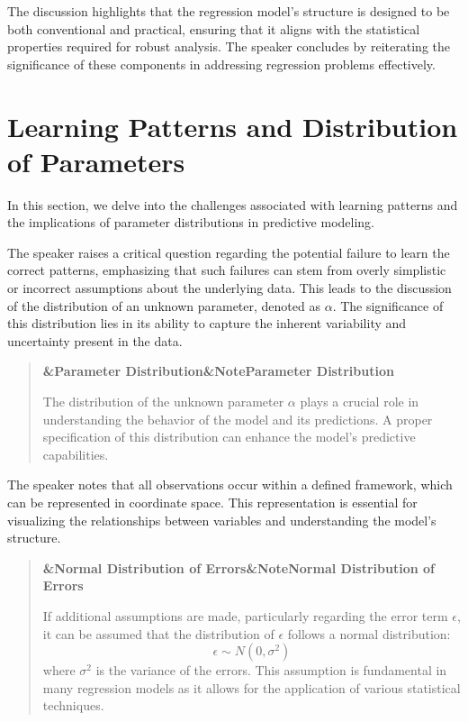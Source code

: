 \documentclass[a4paper]{article}
\providecommand{\mathcal}[1]{\mathit{#1}}
\newcommand{\boxheading}[1]{%
  \par\smallskip
  \noindent\textbf{\ifx&#1&Note\else#1\fi}\par
  \smallskip
}
\newenvironment{thmbox}[1][]{%
  \begin{quote}\color{blue!60!black}\boxheading{#1}\normalcolor
}{\end{quote}}
\newenvironment{rembox}[1][]{%
  \begin{quote}\color{black!70}\boxheading{#1}\normalcolor
}{\end{quote}}
\begin{document}
The discussion highlights that the regression model's structure is designed to be both conventional and practical, ensuring that it aligns with the statistical properties required for robust analysis. The speaker concludes by reiterating the significance of these components in addressing regression problems effectively.

\section{Learning Patterns and Distribution of Parameters}
In this section, we delve into the challenges associated with learning patterns and the implications of parameter distributions in predictive modeling.

The speaker raises a critical question regarding the potential failure to learn the correct patterns, emphasizing that such failures can stem from overly simplistic or incorrect assumptions about the underlying data. This leads to the discussion of the distribution of an unknown parameter, denoted as \( \alpha \). The significance of this distribution lies in its ability to capture the inherent variability and uncertainty present in the data.

\begin{rembox}[Parameter Distribution]
The distribution of the unknown parameter \( \alpha \) plays a crucial role in understanding the behavior of the model and its predictions. A proper specification of this distribution can enhance the model's predictive capabilities.
\end{rembox}

The speaker notes that all observations occur within a defined framework, which can be represented in coordinate space. This representation is essential for visualizing the relationships between variables and understanding the model's structure.

\begin{thmbox}[Normal Distribution of Errors]
If additional assumptions are made, particularly regarding the error term \( \epsilon \), it can be assumed that the distribution of \( \epsilon \) follows a normal distribution:
\begin{equation}
\epsilon \sim \mathcal{N}(0, \sigma^2)
\end{equation}
where \( \sigma^2 \) is the variance of the errors. This assumption is fundamental in many regression models as it allows for the application of various statistical techniques.
\end{thmbox}
\end{document}
